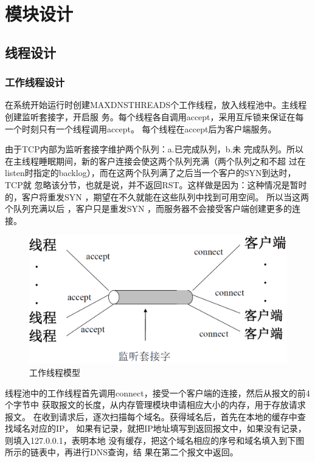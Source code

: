 

\section{模块设计}
\subsection{线程设计} 
\subsubsection{工作线程设计} 
\par{
在系统开始运行时创建MAXDNSTHREADS个工作线程，放入线程池中。主线程创建监听套接字，开启服
务。每个线程各自调用accept，采用互斥锁来保证在每一个时刻只有一个线程调用accept。
每个线程在accept后为客户端服务。}
\par{由于TCP内部为监听套接字维护两个队列：a.已完成队列，b.未
完成队列。所以在主线程睡眠期间，新的客户连接会使这两个队列充满（两个队列之和不超
过在listen时指定的backlog），而在这两个队列满了之后当一个客户的SYN到达时，TCP就
忽略该分节，也就是说，并不返回RST。这样做是因为：这种情况是暂时的，客户将重发SYN
，期望在不久就能在这些队列中找到可用空间\cite{unpv1}。 所以当这两个队列充满以后
，客户只是重发SYN ，而服务器不会接受客户端创建更多的连接。}
\begin{figure}[H]
\centering
\includegraphics[keepaspectratio, scale=0.4]{pitures/xianchengmoxing.png}
\caption{工作线程模型} 
\end{figure}

线程池中的工作线程首先调用connect，接受一个客户端的连接，然后从报文的前4个字节中
获取报文的长度，从内存管理模块申请相应大小的内存，用于存放请求报文。
在收到请求后，逐次扫描每个域名。获得域名后，首先在本地的缓存中查找域名对应的IP，
如果有记录，就把IP地址填写到返回报文中，如果没有记录，则填入127.0.0.1，表明本地
没有缓存，把这个域名相应的序号和域名填入到下图所示的链表中，再进行DNS查询，结
果在第二个报文中返回。

